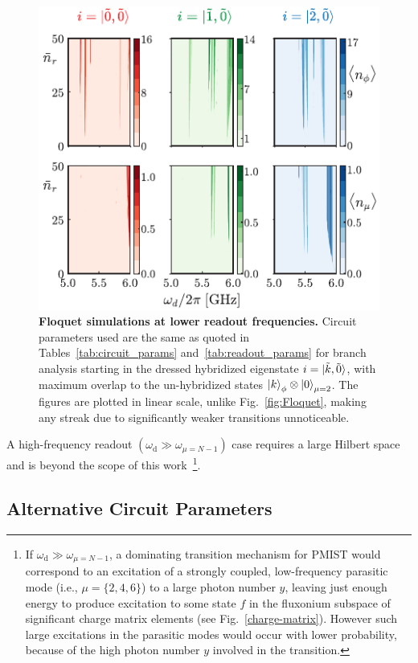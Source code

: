 \documentclass[%
reprint,
superscriptaddress,
 amsmath,amssymb,
 aps,
 prx,
longbibliography,
floatfix,
]{revtex4-2}
\begin{document}
\begin{figure}[t]
    \centering
    \includegraphics[width=\linewidth]{Figures/Floquet_low.pdf}
    \caption{{\bf Floquet simulations at lower readout frequencies.} Circuit parameters used are the same as quoted in Tables~\ref{tab:circuit_params} and~\ref{tab:readout_params} for branch analysis starting in the dressed hybridized eigenstate $i=\ket{\tilde{k},\tilde{0}}$, with maximum overlap to the un-hybridized states $\ket{k}_\phi\otimes\ket{0}_{\mu=2}$. The figures are plotted in linear scale, unlike Fig.~\ref{fig:Floquet}, making any streak due to significantly weaker transitions unnoticeable.}
    \label{fig:Flo_low}
\end{figure}

A high-frequency readout $(\omega_\textrm{d}\gg \omega_{\mu=N-1})$ case requires a large Hilbert space and is beyond the scope of this work~\footnote{If  $\omega_\textrm{d}\gg \omega_{\mu=N-1}$, a dominating transition mechanism for PMIST would correspond to an excitation of a strongly coupled, low-frequency parasitic mode (i.e., $\mu=\{2,4,6\}$) to a large photon number $y$, leaving just enough energy to produce excitation to some state $f$ in the fluxonium subspace of significant charge matrix elements (see Fig.~\ref{charge-matrix}). However such large excitations in the parasitic modes would occur with lower probability, because of the high photon number $y$ involved in the transition.}. 


\subsection{Alternative Circuit Parameters}\label{Will_circuit}
\end{document}
